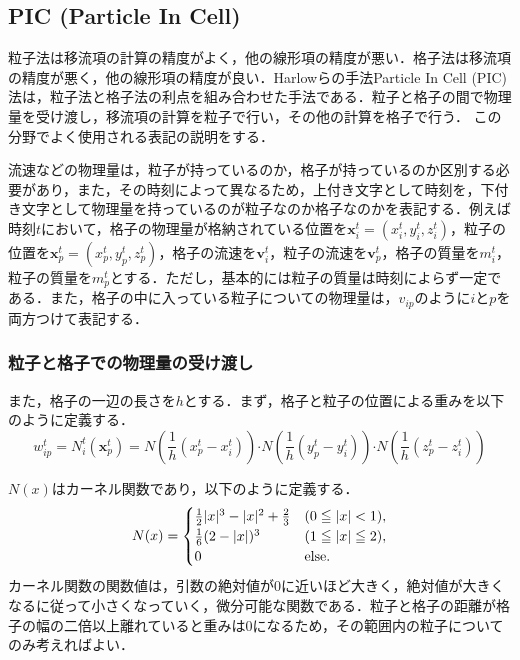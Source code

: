 \documentclass[a4j,12pt]{jreport}
\begin{document}
\subsection{PIC (Particle In Cell) } \label{subsec:PIC}
粒子法は移流項の計算の精度がよく，他の線形項の精度が悪い．格子法は移流項の精度が悪く，他の線形項の精度が良い．Harlowらの手法Particle In Cell (PIC) 法\cite{PIC}は，粒子法と格子法の利点を組み合わせた手法である．粒子と格子の間で物理量を受け渡し，移流項の計算を粒子で行い，その他の計算を格子で行う．
この分野でよく使用される表記の説明をする．

流速などの物理量は，粒子が持っているのか，格子が持っているのか区別する必要があり，また，その時刻によって異なるため，上付き文字として時刻を，下付き文字として物理量を持っているのが粒子なのか格子なのかを表記する．例えば
時刻$t$において，格子の物理量が格納されている位置を$\bm{x}^t_i =  (x^t_i,y^t_i,z^t_i) $，粒子の位置を$\bm{x}^t_p =  (x^t_p,y^t_p,z^t_p) $，格子の流速を$\bm{v}^t_i$，粒子の流速を$\bm{v}^t_p$，格子の質量を$m^t_i$，粒子の質量を$m^t_p$とする．ただし，基本的には粒子の質量は時刻によらず一定である．また，格子の中に入っている粒子についての物理量は，$v_{ip}$のように$iとp$を両方つけて表記する．
\subsubsection{粒子と格子での物理量の受け渡し} \label{subsec:P2GG2P}
また，格子の一辺の長さを$h$とする．まず，格子と粒子の位置による重みを以下のように定義する．
\begin{equation}\label{eq:weight}
w^t_{ip} = N^t_i (\bm{x}^t_p)  = N (\frac{1}{h} (x^t_p - x^t_i) ) \boldsymbol{\cdot}N (\frac{1}{h} (y^t_p - y^t_i) ) \boldsymbol{\cdot}N (\frac{1}{h} (z^t_p - z^t_i) ) 
\end{equation} 

$N (x) $はカーネル関数であり，以下のように定義する．
\begin{equation}\label{eq:kernel}
N (x)  = 
\begin{cases}
\frac{1}{2}|x|^3 - |x|^2 + \frac{2}{3} &  (0\leqq|x|<1),  \\
\frac{1}{6} (2-|x|) ^3 &  (1\leqq|x|\leqq2),  \\
0 & \rm{else}.
\end{cases}
\end{equation} 
カーネル関数の関数値は，引数の絶対値が0に近いほど大きく，絶対値が大きくなるに従って小さくなっていく，微分可能な関数である．粒子と格子の距離が格子の幅の二倍以上離れていると重みは0になるため，その範囲内の粒子についてのみ考えればよい．
\end{document}
